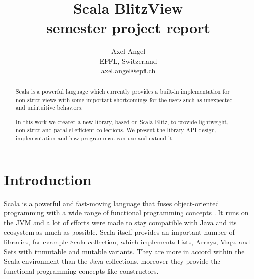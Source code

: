 \documentclass[a4paper,12pt,twocolumn]{article}
\title{Scala BlitzView\\{\small semester project report}}
\author{Axel Angel\\{\small EPFL, Switzerland}\\axel.angel@epfl.ch}
\begin{document}
\maketitle

\begin{abstract}
Scala is a powerful language which currently provides a built-in implementation for non-strict views with some important shortcomings for the users such as unexpected and unintuitive behaviors.

In this work we created a new library, based on Scala Blitz, to provide lightweight, non-strict and parallel-efficient collections.
We present the library API design, implementation and how programmers can use and extend it.
\end{abstract}

\section{Introduction}
Scala is a powerful and fast-moving language that fuses object-oriented programming with a wide range of functional programming concepts \cite{scala-overview}.
It runs on the JVM and a lot of efforts were made to stay compatible with Java and its ecosystem as much as possible.
Scala itself provides an important number of libraries, for example Scala collection, which implements Lists, Arrays, Maps and Sets with immutable and mutable variants.
They are more in accord within the Scala environment than the Java collections, moreover they provide the functional programming concepts like constructors.
\end{document}
